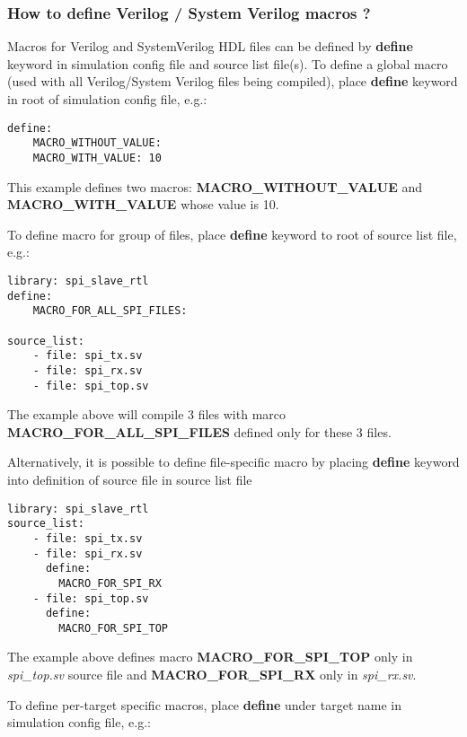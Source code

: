 \documentclass{tropic_design_spec}
\begin{document}
\subsubsection{How to define Verilog / System Verilog macros ?}
\label{sec:how-to-define-verilog-system-verilog-macros}

Macros for Verilog and SystemVerilog HDL files can be defined by \textbf{define} keyword
in simulation config file and source list file(s). To define a global macro (used with
all Verilog/System Verilog files being compiled), place \textbf{define} keyword in root
of simulation config file, e.g.:

\begin{lstlisting}
define:
    MACRO_WITHOUT_VALUE:
    MACRO_WITH_VALUE: 10
\end{lstlisting}

This example defines two macros: \textbf{MACRO_WITHOUT_VALUE} and \textbf{MACRO_WITH_VALUE}
whose value is 10. 

To define macro for group of files, place \textbf{define} keyword to root of source list file, e.g.:

\begin{lstlisting}
library: spi_slave_rtl
define:
    MACRO_FOR_ALL_SPI_FILES:

source_list:
    - file: spi_tx.sv
    - file: spi_rx.sv
    - file: spi_top.sv
\end{lstlisting}

The example above will compile 3 files with marco \textbf{MACRO_FOR_ALL_SPI_FILES} defined
only for these 3 files.

Alternatively, it is possible to define file-specific macro by placing \textbf{define}
keyword into definition of source file in source list file

\begin{lstlisting}
library: spi_slave_rtl
source_list:
    - file: spi_tx.sv
    - file: spi_rx.sv
      define:
        MACRO_FOR_SPI_RX
    - file: spi_top.sv
      define:
        MACRO_FOR_SPI_TOP
\end{lstlisting}

The example above defines macro \textbf{MACRO_FOR_SPI_TOP} only in \textit{spi_top.sv}
source file and \textbf{MACRO_FOR_SPI_RX} only in \textit{spi_rx.sv}.

To define per-target specific macros, place \textbf{define} under
target name in simulation config file, e.g.:
\end{document}
